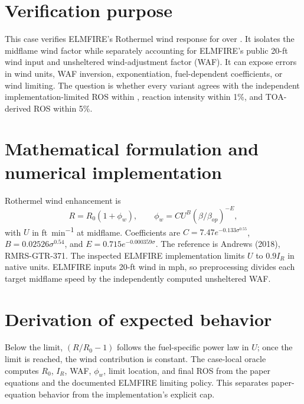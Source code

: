 \section{Verification purpose}
This case verifies ELMFIRE's Rothermel wind response for \FuelSet{} over \WindSet.  It isolates the midflame wind factor while separately accounting for ELMFIRE's public 20-ft wind input and unsheltered wind-adjustment factor (WAF).  It can expose errors in wind units, WAF inversion, exponentiation, fuel-dependent coefficients, or wind limiting.  The question is whether every variant agrees with the independent implementation-limited ROS within \RosTolerance{}, reaction intensity within 1\%, and TOA-derived ROS within 5\%.

\section{Mathematical formulation and numerical implementation}
Rothermel wind enhancement is
\begin{equation}R=R_0(1+\phi_w),\qquad \phi_w=C U^B(\beta/\beta_{op})^{-E},\end{equation}
with $U$ in \si{ft.min^{-1}} at midflame.  Coefficients are $C=7.47e^{-0.133\sigma^{0.55}}$, $B=0.02526\sigma^{0.54}$, and $E=0.715e^{-0.000359\sigma}$.  The reference is Andrews (2018), RMRS-GTR-371.  The inspected ELMFIRE implementation limits $U$ to $0.9I_R$ in native units.  ELMFIRE inputs 20-ft wind in mph, so preprocessing divides each target midflame speed by the independently computed unsheltered WAF.

\section{Derivation of expected behavior}
Below the limit, $(R/R_0-1)$ follows the fuel-specific power law in $U$; once the limit is reached, the wind contribution is constant.  The case-local oracle computes $R_0$, $I_R$, WAF, $\phi_w$, limit location, and final ROS from the paper equations and the documented ELMFIRE limiting policy.  This separates paper-equation behavior from the implementation's explicit cap.


